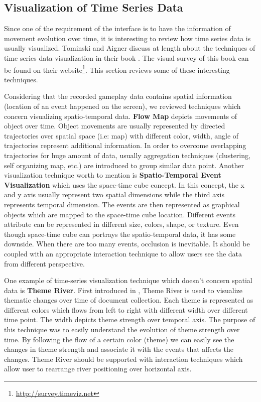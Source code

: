 \documentclass{vgtc}                          %
\begin{document}
\subsection{Visualization of Time Series Data}

Since one of the requirement of the interface is to have the information of movement evolution over time, it is interesting to review how time series data is usually visualized. Tominski and Aigner discuss at length about the techniques of time series data visualization in their book \cite{aigner}. The visual survey of this book can be found on their website\footnote{\url{http://survey.timeviz.net}}. This section reviews some of these interesting techniques.

Considering that the recorded gameplay data contains spatial information (location of an event happened on the screen), we reviewed techniques which concern visualizing spatio-temporal data. \textbf{Flow Map} \cite{adrienko} depicts movements of object over time. Object movements are usually represented by directed trajectories over spatial space (i.e: map) with different color, width, angle of trajectories represent additional information. In order to overcome overlapping trajectories for huge amount of data, usually aggregation techniques (clustering, self organizing map, etc.) are introduced to group similar data point. Another visualization technique worth to mention is \textbf{Spatio-Temporal Event Visualization} \cite{turdukulov, tominski, gatalsky} which uses the space-time cube concept. In this concept, the x and y axis usually represent two spatial dimensions while the third axis represents temporal dimension. The events are then represented as graphical objects which are mapped to the space-time cube location. Different events attribute can be represented in different size, colors, shape, or texture. Even though space-time cube can portrays the spatio-temporal data, it has some downside. When there are too many events, occlusion is inevitable. It should be coupled with an appropriate interaction technique to allow users see the data from different perspective.

One example of time-series visualization technique which doesn't concern spatial data is \textbf{Theme River}. First introduced in \cite{havre}, Theme River is used to visualize thematic changes over time of document collection. Each theme is represented as different colors which flows from left to right with different width over different time point. The width depicts theme strength over temporal axis. The purpose of this technique was to easily understand the evolution of theme strength over time. By following the flow of a certain color (theme) we can easily see the changes in theme strength and associate it with the events that affects the changes. Theme River should be supported with interaction techniques which allow user to rearrange river positioning over horizontal axis. 
\end{document}
